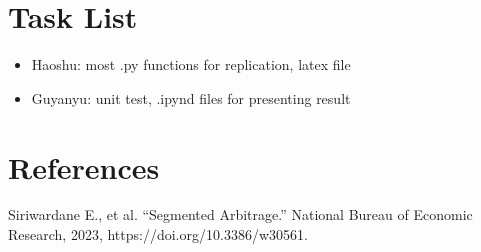 \documentclass{article}
\begin{document}
\section{Task List}

\begin{itemize}
    \item Haoshu: most .py functions for replication, latex file
    \item Guyanyu: unit test, .ipynd files for presenting result
\end{itemize}












\section{References}
Siriwardane E., et al.  “Segmented Arbitrage.” National Bureau of Economic Research, 2023, https://doi.org/10.3386/w30561.



\end{document}
